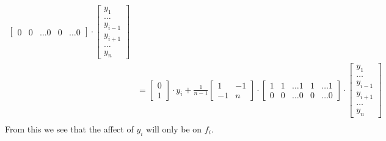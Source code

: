 \begin{enumerate}
{\begin{equation}
\begin{split}
\begin{bmatrix}
        0 & 0 & \ldots 0 & 0 & \ldots 0
      \end{bmatrix} \cdot 
      \begin{bmatrix}
        y_1 \\
        \ldots \\
        y_{i-1} \\
        y_{i+1} \\
        \ldots \\
        y_n
      \end{bmatrix} \\
      &=   
      \begin{bmatrix}
        0 \\
        1
      \end{bmatrix} \cdot 
      y_i  + \frac{1}{n-1}  
      \begin{bmatrix}
        1 & -1 \\
        -1 & n
      \end{bmatrix} \cdot
      \begin{bmatrix}
        1 & 1 & \ldots 1 & 1 & \ldots 1 \\
        0 & 0 & \ldots 0 & 0 & \ldots 0
      \end{bmatrix} \cdot 
      \begin{bmatrix}
        y_1 \\
        \ldots \\
        y_{i-1} \\
        y_{i+1} \\
        \ldots \\
        y_n
      \end{bmatrix} \\
    \end{split}
  \end{equation}
  From this we see that the affect of $y_i$ will only be on $f_i$.
  
}
\end{enumerate}

